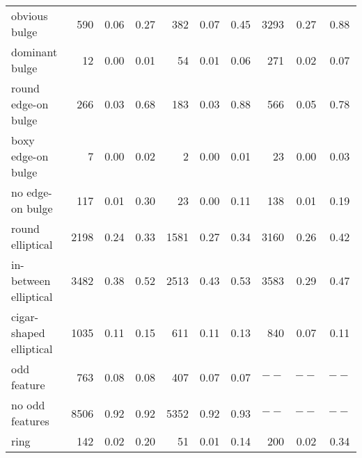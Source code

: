 \documentclass[iop,apj,tighten]{emulateapj}
\begin{document}
\begin{table*}
\begin{tabular}{l|rcc|rcc|rcc}
    obvious bulge           &    590 & 0.06 & 0.27 &    382 & 0.07 & 0.45       &   3293 & 0.27 & 0.88                                                   \\
    dominant bulge          &     12 & 0.00 & 0.01 &     54 & 0.01 & 0.06       &    271 & 0.02 & 0.07                                                   \\
    \hline                                                                                                                                         
    round edge-on bulge     &    266 & 0.03 & 0.68 &    183 & 0.03 & 0.88       &    566 & 0.05 & 0.78                                                   \\
    boxy edge-on bulge      &      7 & 0.00 & 0.02 &      2 & 0.00 & 0.01       &     23 & 0.00 & 0.03                                                   \\
    no edge-on bulge        &    117 & 0.01 & 0.30 &     23 & 0.00 & 0.11       &    138 & 0.01 & 0.19                                                   \\
    \hline                                                                                                                                         
    round elliptical        &   2198 & 0.24 & 0.33 &   1581 & 0.27 & 0.34       &   3160 & 0.26 & 0.42                                                   \\
    in-between elliptical   &   3482 & 0.38 & 0.52 &   2513 & 0.43 & 0.53       &   3583 & 0.29 & 0.47                                                   \\
    cigar-shaped elliptical &   1035 & 0.11 & 0.15 &    611 & 0.11 & 0.13       &    840 & 0.07 & 0.11                                                   \\
    \hline                                                                                                                                         
    odd feature             &    763 & 0.08 & 0.08 &    407 & 0.07 & 0.07       &  $--$  & $--$ & $--$                                                   \\
    no odd features         &   8506 & 0.92 & 0.92 &   5352 & 0.92 & 0.93       &  $--$  & $--$ & $--$                                                   \\
    \hline                                                                                                                                         
    ring                    &    142 & 0.02 & 0.20 &     51 & 0.01 & 0.14       &    200 & 0.02 & 0.34                                                   \\

\end{tabular}
\end{table*}
\end{document}
